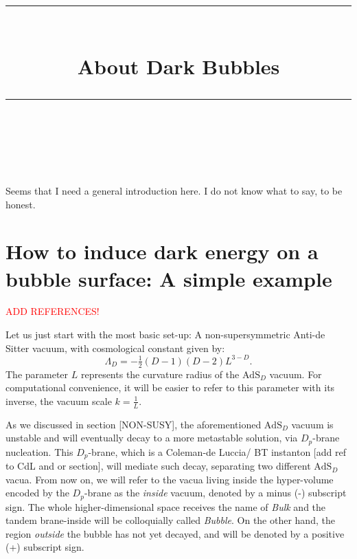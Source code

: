\documentclass[12pt, a4paper]{article} %
\title{	
	\normalfont\normalsize
	\textsc{}\\ %
	\vspace{5pt} %
	\rule{\linewidth}{0.2pt}\\ %
	\vspace{10pt} %
	{\huge About Dark Bubbles}\\ %
	\vspace{5pt} %
	\rule{\linewidth}{-2pt}\\ %
	\vspace{-25pt} %
	\date{}
}
\author{}
\begin{document}
\maketitle 
\tableofcontents




\newpage

Seems that I need a general introduction here. I do not know what to say, to be honest.
\section{How to induce dark energy on a bubble surface: A simple example}

\textcolor{red}{ADD REFERENCES!}

Let us just start with the most basic set-up: A non-supersymmetric Anti-de Sitter vacuum, with cosmological constant given by:
\begin{equation}
	\Lambda_{D} = - \tfrac{1}{2}(D-1)(D-2)L^{3-D}.
\end{equation}
The parameter $L$ represents the curvature radius of the $\text{AdS}_{D}$ vacuum. For computational convenience, it will be easier to refer to this parameter with its inverse, the vacuum scale $k = \tfrac{1}{L}$.

As we discussed in section [NON-SUSY], the aforementioned $\text{AdS}_{D}$ vacuum is unstable and will eventually decay to a more metastable solution, via $D_{p}$-brane nucleation. This $D_{p}$-brane, which is a Coleman-de Luccia/ BT instanton [add ref to CdL and or section], will mediate such decay, separating two different $\text{AdS}_{D}$ vacua. From now on, we will refer to the vacua living inside the hyper-volume encoded by the $D_{p}$-brane as the \textit{inside} vacuum, denoted by a minus (-) subscript sign. The whole higher-dimensional space receives the name of \textit{Bulk} and the tandem brane-inside will be colloquially called \textit{Bubble}. On the other hand, the region \textit{outside} the bubble has not yet decayed, and will be denoted by a positive (+) subscript sign.

\begin{figure}[h!]
	  \centering
	  
	  \caption{}
\end{figure}
\end{document}
